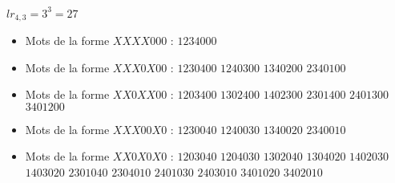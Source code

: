 \begin{example}[Théorème 25 : $a = 4, b = 3$]
    $lr_{4,3} = 3^3 = 27$
    \begin{itemize}
        \item Mots de la forme $XXXX000$ :
            \subitem $1234000$
        \item Mots de la forme $XXX0X00$ :
            \subitem $1230400$
            \hspace{2cm} $1240300$
            \hspace{2cm} $1340200$
            \subitem $2340100$
        \item Mots de la forme $XX0XX00$ :
            \subitem $1203400$
            \hspace{2cm} $1302400$
            \hspace{2cm} $1402300$
            \subitem $2301400$
            \hspace{2cm} $2401300$
            \hspace{2cm} $3401200$
        \item Mots de la forme $XXX00X0$ :
            \subitem $1230040$
            \hspace{2cm} $1240030$
            \hspace{2cm} $1340020$
            \subitem $2340010$
        \item Mots de la forme $XX0X0X0$ :
            \subitem $1203040$
            \hspace{2cm} $1204030$
            \hspace{2cm} $1302040$
            \subitem $1304020$
            \hspace{2cm} $1402030$
            \hspace{2cm} $1403020$
            \subitem $2301040$
            \hspace{2cm} $2304010$
            \hspace{2cm} $2401030$
            \subitem $2403010$
            \hspace{2cm} $3401020$
            \hspace{2cm} $3402010$
    \end{itemize}
    
\end{example}